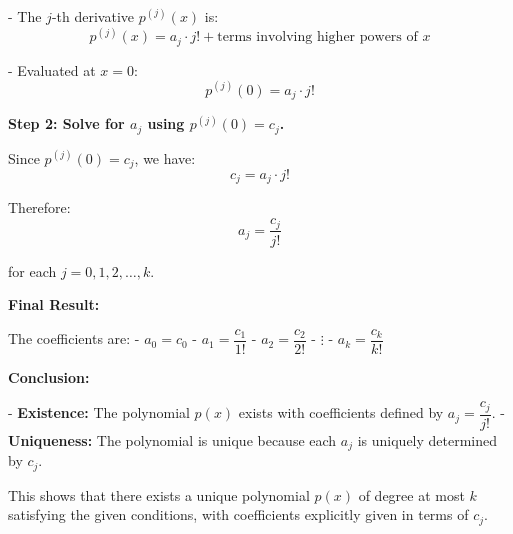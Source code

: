 \documentclass[12pt]{article}
\begin{document}
- The \( j \)-th derivative \( p^{(j)}(x) \) is:
  \[
  p^{(j)}(x) = a_j \cdot j! + \text{terms involving higher powers of } x
  \]

- Evaluated at \( x = 0 \):
  \[
  p^{(j)}(0) = a_j \cdot j!
  \]

\textbf{Step 2: Solve for \( a_j \) using \( p^{(j)}(0) = c_j \).}

Since \( p^{(j)}(0) = c_j \), we have:
\[
c_j = a_j \cdot j!
\]

Therefore:
\[
a_j = \frac{c_j}{j!}
\]

for each \( j = 0, 1, 2, \dots, k \).


\textbf{Final Result:}

The coefficients are:
- \( a_0 = c_0 \)
- \( a_1 = \dfrac{c_1}{1!} \)
- \( a_2 = \dfrac{c_2}{2!} \)
- \( \vdots \)
- \( a_k = \dfrac{c_k}{k!} \)

\textbf{Conclusion:}

- \textbf{Existence:} The polynomial \( p(x) \) exists with coefficients defined by \( a_j = \dfrac{c_j}{j!} \).
- \textbf{Uniqueness:} The polynomial is unique because each \( a_j \) is uniquely determined by \( c_j \).


This shows that there exists a unique polynomial \( p(x) \) of degree at most \( k \) satisfying the given conditions, with coefficients explicitly given in terms of \( c_j \).
\end{document}
